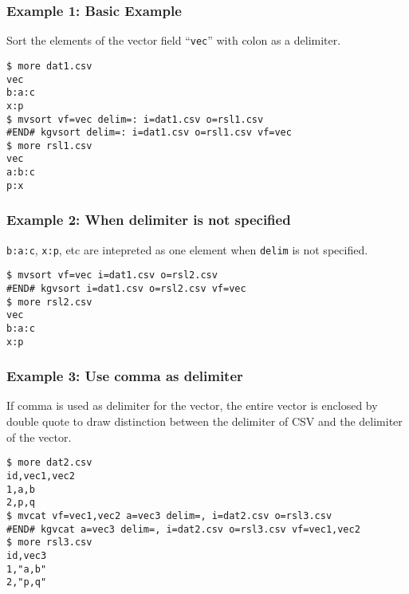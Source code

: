 \subsubsection*{Example 1: Basic Example}

Sort the elements of the vector field “\verb|vec|” with colon as a delimiter.


\begin{Verbatim}[baselinestretch=0.7,frame=single]
$ more dat1.csv
vec
b:a:c
x:p
$ mvsort vf=vec delim=: i=dat1.csv o=rsl1.csv
#END# kgvsort delim=: i=dat1.csv o=rsl1.csv vf=vec
$ more rsl1.csv
vec
a:b:c
p:x
\end{Verbatim}
\subsubsection*{Example 2: When delimiter is not specified}

\verb|b:a:c|, \verb|x:p|, etc are intepreted as one element when \verb|delim| is not specified.


\begin{Verbatim}[baselinestretch=0.7,frame=single]
$ mvsort vf=vec i=dat1.csv o=rsl2.csv
#END# kgvsort i=dat1.csv o=rsl2.csv vf=vec
$ more rsl2.csv
vec
b:a:c
x:p
\end{Verbatim}
\subsubsection*{Example 3: Use comma as delimiter}

If comma is used as delimiter for the vector, the entire vector is enclosed by double quote to draw distinction between the delimiter of CSV and the delimiter of the vector.


\begin{Verbatim}[baselinestretch=0.7,frame=single]
$ more dat2.csv
id,vec1,vec2
1,a,b
2,p,q
$ mvcat vf=vec1,vec2 a=vec3 delim=, i=dat2.csv o=rsl3.csv
#END# kgvcat a=vec3 delim=, i=dat2.csv o=rsl3.csv vf=vec1,vec2
$ more rsl3.csv
id,vec3
1,"a,b"
2,"p,q"
\end{Verbatim}
